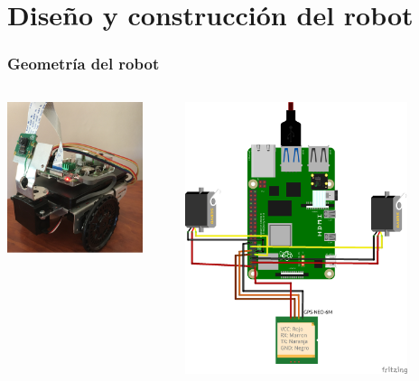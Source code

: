 \documentclass{beamer}
\begin{document}
\section{Diseño y construcción del robot}
\begin{frame}
	\frametitle{Geometría del robot}

	\begin{columns}
		\begin{column}{0.50\textwidth}
			\centering
			\includegraphics[width=0.85\textwidth]{figs/Original.png} \\[5pt]
		\end{column}
		\begin{column}{0.5\textwidth}
			\centering
			\includegraphics[width=0.8\textwidth]{figs/modelocompleto_bb3.png} \\[5pt]

\end{column}
\end{columns}
\end{frame}
\end{document}
